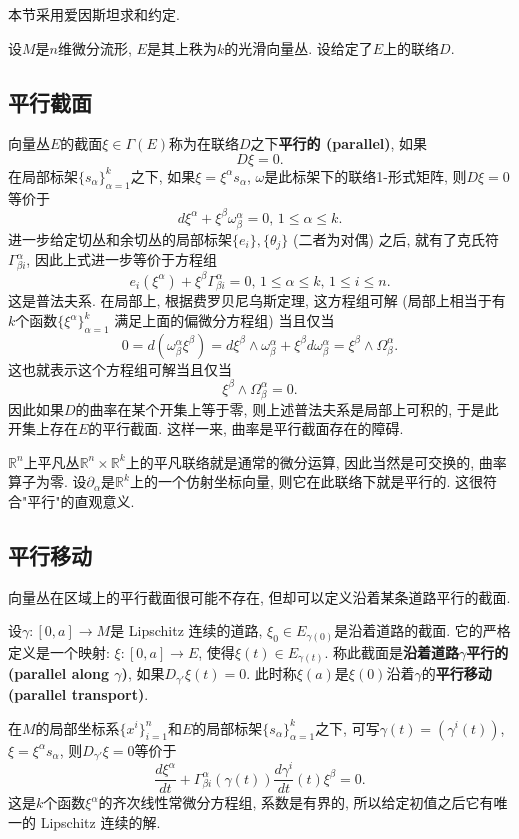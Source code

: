 
本节采用爱因斯坦求和约定.

设$M$是$n$维微分流形, $E$是其上秩为$k$的光滑向量丛. 设给定了$E$上的联络$D$.

\subsection{平行截面}

向量丛$E$的截面$\xi\in\Gamma(E)$称为在联络$D$之下\textbf{平行的 (parallel)}, 如果
$$D\xi=0.$$
在局部标架$\{s_\alpha\}_{\alpha=1}^k$之下, 如果$\xi=\xi^\alpha s_\alpha$, $\omega$是此标架下的联络1-形式矩阵, 则$D\xi=0$等价于
$$
d\xi^\alpha+\xi^\beta\omega^\alpha_\beta=0,\,1\leq \alpha\leq k.
$$
进一步给定切丛和余切丛的局部标架$\{e_i\},\{\theta_j\}$ (二者为对偶) 之后, 就有了克氏符$\Gamma_{\beta i}^\alpha$, 因此上式进一步等价于方程组
$$
e_i(\xi^\alpha)+\xi^\beta\Gamma^\alpha_{\beta i}=0,\,1\leq \alpha\leq k,\,1\leq i\leq n.
$$
这是普法夫系. 在局部上, 根据费罗贝尼乌斯定理, 这方程组可解 (局部上相当于有$k$个函数$\{\xi^\alpha\}_{\alpha=1}^k$ 满足上面的偏微分方程组) 当且仅当
$$
0=d(\omega^\alpha_\beta\xi^\beta)=d\xi^\beta\wedge\omega^\alpha_\beta+\xi^\beta d\omega^\alpha_\beta=\xi^\beta\wedge\Omega_\beta^\alpha.
$$
这也就表示这个方程组可解当且仅当
$$
\xi^\beta\wedge\Omega_\beta^\alpha=0.
$$
因此如果$D$的曲率在某个开集上等于零, 则上述普法夫系是局部上可积的, 于是此开集上存在$E$的平行截面. 这样一来, 曲率是平行截面存在的障碍.

$\mathbb{R}^n$上平凡丛$\mathbb{R}^n\times\mathbb{R}^k$上的平凡联络就是通常的微分运算, 因此当然是可交换的, 曲率算子为零. 设$\partial_\alpha$是$\mathbb{R}^k$上的一个仿射坐标向量, 则它在此联络下就是平行的. 这很符合"平行"的直观意义. 

\subsection{平行移动}
向量丛在区域上的平行截面很可能不存在, 但却可以定义沿着某条道路平行的截面. 

设$\gamma:[0,a]\to M$是 Lipschitz 连续的道路, $\xi_0\in E_{\gamma(0)}$是沿着道路的截面. 它的严格定义是一个映射: $\xi:[0,a]\to E$, 使得$\xi(t)\in E_{\gamma(t)}$. 称此截面是\textbf{沿着道路$\gamma$平行的 (parallel along $\gamma$)}, 如果$D_{\gamma'}\xi(t)=0$. 此时称$\xi(a)$是$\xi(0)$沿着$\gamma$的\textbf{平行移动 (parallel transport)}. 

在$M$的局部坐标系$\{x^i\}_{i=1}^n$和$E$的局部标架$\{s_{\alpha}\}_{\alpha=1}^k$之下, 可写$\gamma(t)=(\gamma^i(t))$, $\xi=\xi^\alpha s_\alpha$, 则$D_{\gamma'}\xi=0$等价于
$$
\frac{d\xi^\alpha}{dt}+\Gamma_{\beta i}^\alpha(\gamma(t))\frac{d\gamma^i}{dt}(t)\xi^\beta=0.
$$
这是$k$个函数$\xi^\alpha$的齐次线性常微分方程组, 系数是有界的, 所以给定初值之后它有唯一的 Lipschitz 连续的解. 

